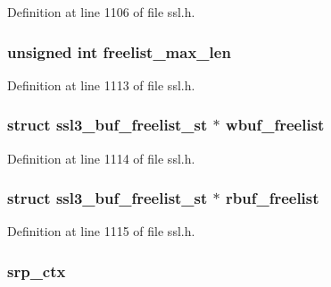 Definition at line 1106 of file ssl.\+h.

\subsubsection[{\texorpdfstring{freelist\+\_\+max\+\_\+len}{freelist_max_len}}]{\setlength{\rightskip}{0pt plus 5cm}unsigned int freelist\+\_\+max\+\_\+len}\hypertarget{structssl__ctx__st_ae28a83432cb40d9eaaf092fa352a7d55}{}\label{structssl__ctx__st_ae28a83432cb40d9eaaf092fa352a7d55}


Definition at line 1113 of file ssl.\+h.

\subsubsection[{\texorpdfstring{wbuf\+\_\+freelist}{wbuf_freelist}}]{\setlength{\rightskip}{0pt plus 5cm}struct {\bf ssl3\+\_\+buf\+\_\+freelist\+\_\+st} $\ast$ wbuf\+\_\+freelist}\hypertarget{structssl__ctx__st_a670ba9bd5c510cd59c87d4f4ac422377}{}\label{structssl__ctx__st_a670ba9bd5c510cd59c87d4f4ac422377}


Definition at line 1114 of file ssl.\+h.

\subsubsection[{\texorpdfstring{rbuf\+\_\+freelist}{rbuf_freelist}}]{\setlength{\rightskip}{0pt plus 5cm}struct {\bf ssl3\+\_\+buf\+\_\+freelist\+\_\+st} $\ast$ rbuf\+\_\+freelist}\hypertarget{structssl__ctx__st_a5adb764f28839f3d62dff9c1212a55b2}{}\label{structssl__ctx__st_a5adb764f28839f3d62dff9c1212a55b2}


Definition at line 1115 of file ssl.\+h.

\subsubsection[{\texorpdfstring{srp\+\_\+ctx}{srp_ctx}}]{ srp\+\_\+ctx}\hypertarget{structssl__ctx__st_ad3a544f7f1590f59a020f91dbd13ee09}{}\label{structssl__ctx__st_ad3a544f7f1590f59a020f91dbd13ee09}


